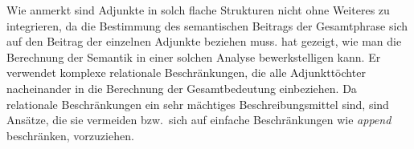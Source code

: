 Wie \citet[]{Netter92} anmerkt sind Adjunkte in solch flache Strukturen nicht ohne Weiteres zu
integrieren, da die Bestimmung des semantischen Beitrags der Gesamtphrase sich auf den Beitrag
der einzelnen Adjunkte beziehen muss. \citet{Kasper94a} hat gezeigt, wie man die Berechnung der
Semantik in einer solchen Analyse bewerkstelligen kann. Er verwendet komplexe relationale Beschränkungen, die alle
Adjunkttöchter nacheinander in die Berechnung der Gesamtbedeutung einbeziehen. Da relationale
Beschränkungen ein sehr mächtiges Beschreibungsmittel sind, sind Ansätze, die sie vermeiden bzw.\
sich auf einfache Beschränkungen wie \emph{append} beschränken, vorzuziehen.

